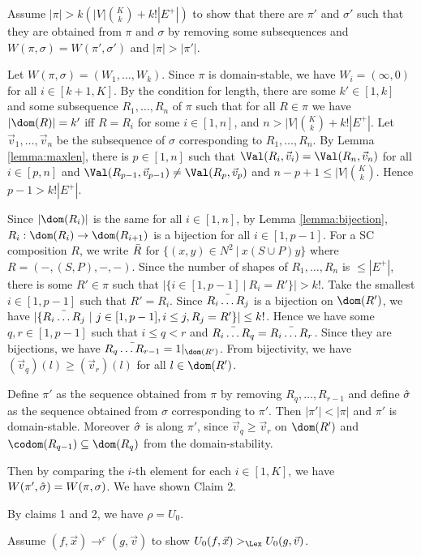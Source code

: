 Assume $|\pi| > k(|V|{K \choose k}+k!|E^+|)$
to show that there are $\pi'$ and $\sigma'$ such that
they are obtained from $\pi$ and $\sigma$ by removing some subsequences
and $W(\pi,\sigma) = W(\pi',\sigma')$ and $|\pi|>|\pi'|$.

Let $W(\pi,\sigma)=(W_1,\ldots,W_k)$.
Since $\pi$ is domain-stable, we have $W_i=(\infty,0)$ for all $i \in [k+1,K]$.
By the condition for length, there are some $k' \in [1,k]$ and
some subsequence $R_1,\ldots,R_n$ of $\pi$
such that
for all $R \in \pi$ we have
$|\dom(R)|=k'$ iff $R=R_i$ for some $i \in [1,n]$, and
$n > |V|{K \choose k}+k!|E^+|$.
Let $\Vec v_1,\ldots,\Vec v_n$ be the subsequence of $\sigma$
corresponding to $R_1,\ldots,R_n$.
By Lemma \ref{lemma:maxlen},
there is $p \in [1,n]$ such that 
$\Val(R_i,\Vec v_i) = \Val(R_n,\Vec v_n)$ for all $i \in [p,n]$
and $\Val(R_{p-1},\Vec v_{p-1}) \ne \Val(R_p,\Vec v_p)$
and $n-p+1 \le |V|{K \choose k}$.
Hence $p-1 > k!|E^+|$.

Since $|\dom(R_i)|$ is the same for all $i \in [1,n]$,
by Lemma \ref{lemma:bijection}, $R_i : \dom(R_i) \to \dom(R_{i+1})$
is a bijection for all $i \in [1,p-1]$.
For a SC composition $R$, we write $\Bar R$ for
$\{(x,y) \in N^2 \ |\ x (S \cup P) y \}$ where $R = (-,(S,P),-,-)$.
Since the number of shapes of $R_1,\ldots,R_n$ is $\le |E^+|$,
there is some $R' \in \pi$ such that
$|\{i \in [1,p-1] \ |\ R_i=R'\}| > k!$.
Take the smallest $i \in [1,p-1]$ such that $R'=R_i$.
Since $\Bar{R_i \ldots R_j}$ is a bijection on $\dom(R')$,
we have
$|\{ \Bar{R_i \ldots R_j} \ |\ j \in [1,p-1], i \le j, R_j=R' \}| \le k!$.
Hence we have some $q,r \in [1,p-1]$ such that $i \le q<r$ and
$\Bar{R_i \ldots R_q}=\Bar{R_i \ldots R_r}$.
Since they are bijections, we have
$\Bar{R_q \ldots R_{r-1}} = 1|_{\dom(R')}$.
From bijectivity, we have $(\Vec v_q)(l) \ge (\Vec v_r)(l)$ for all $l \in \dom(R')$.

Define $\pi'$ as the sequence obtained from $\pi$ by removing
$R_{q},\ldots,R_{r-1}$ and 
define $\Hat\sigma$ as the sequence obtained from $\sigma$
corresponding to $\pi'$.
Then $|\pi'|<|\pi|$ and $\pi'$ is domain-stable.
Moreover $\Hat\sigma$ is along $\pi'$, since $\Vec v_q \ge \Vec v_r$ on $\dom(R')$
and $\codom(R_{q-1}) \subseteq \dom(R_q)$ from the domain-stability.

Then by comparing the $i$-th element for each $i \in [1,K]$,
we have
$W(\pi',\Hat\sigma)=W(\pi,\sigma)$.
We have shown Claim 2.

By claims 1 and 2, we have $\rho=U_0$.

Assume $(f,\Vec x) \to^c (g,\Vec v)$ to show
$U_0(f,\Vec x) >_\Lex U_0(g,\Vec v)$.

